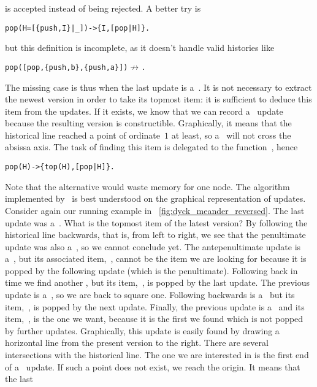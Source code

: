 is accepted instead of being rejected. A better try is
\begin{alltt}
pop(H=[\{push,I\}|_]) -> \{I,[pop|H]\}.\hfill% \emph{Still incomplete}
\end{alltt}
but this definition is incomplete, as it doesn't handle valid
histories like
\begin{alltt}
pop([pop,\{push,b\},\{push,a\}]) \(\nrightarrow\).
\end{alltt}
The missing case is thus when the last update is a~. It
is not necessary to extract the newest version in order to take its
topmost item: it is sufficient to deduce this item from the
updates. If it exists, we know that we can record a~
update because the resulting version is constructible. Graphically, it
means that the historical line reached a point of ordinate~\(1\) at
least, so a~ will not cross the absissa axis. The task of
finding this item is delegated to the function~, hence
\begin{alltt}
pop(H) -> \{top(H),[pop|H]\}.\hfill% \emph{Complete}
\end{alltt}
Note that the alternative \erlcode{[\{pop\}|H]} would waste memory for
one node. The algorithm implemented by~ is best
understood on the graphical representation of updates. Consider again
our running example in \fig~\vref{fig:dyck_meander_reversed}. The last
update was a~. What is the topmost item of the latest
version? By following the historical line backwards, that is, from
left to right, we see that the penultimate update was also
a~, so we cannot conclude yet. The ante\-penultimate
update is a~, but its associated item,~,
cannot be the item we are looking for because it is popped by the
following update (which is the penultimate). Following back in time we
find another , but its item,~, is popped by
the last update. The previous update is a~, so we are
back to square one. Following backwards is a~ but its
item,~, is popped by the next update. Finally, the previous
update is a~ and its item,~, is the one we
want, because it is the first we found which is not popped by further
updates. Graphically, this update is easily found by drawing a
horizontal line from the present version to the right. There are
several intersections with the historical line. The one we are
interested in is the first end of a~ update. If such a
point does not exist, we reach the origin. It means that the last
